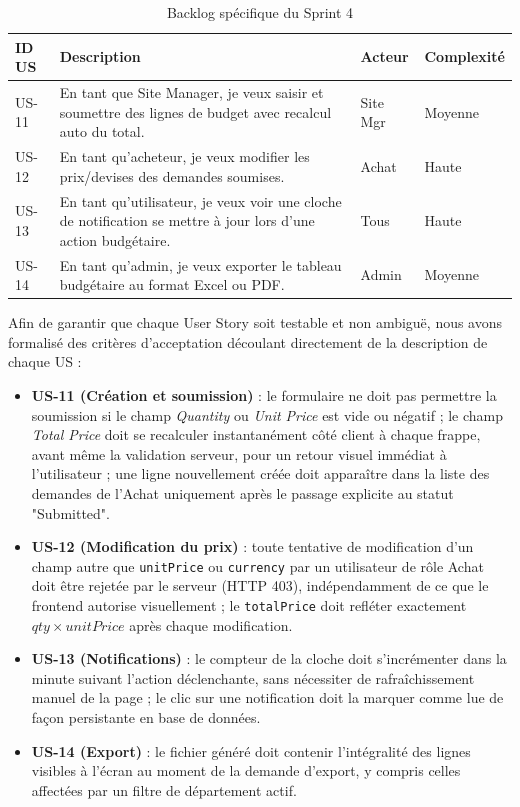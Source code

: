 \begin{table}[h]
\centering
\begin{tabular}{|p{2cm}|p{8cm}|p{2cm}|p{2cm}|}
\hline
\textbf{ID US} & \textbf{Description} & \textbf{Acteur} & \textbf{Complexité} \\ \hline
US-11 & En tant que Site Manager, je veux saisir et soumettre des lignes de budget avec recalcul auto du total. & Site Mgr & Moyenne \\ \hline
US-12 & En tant qu'acheteur, je veux modifier les prix/devises des demandes soumises. & Achat & Haute \\ \hline
US-13 & En tant qu'utilisateur, je veux voir une cloche de notification se mettre à jour lors d'une action budgétaire. & Tous & Haute \\ \hline
US-14 & En tant qu'admin, je veux exporter le tableau budgétaire au format Excel ou PDF. & Admin & Moyenne \\ \hline
\end{tabular}
\caption{Backlog spécifique du Sprint 4}
\label{tab:backlog_sprint4}
\end{table}

Afin de garantir que chaque User Story soit testable et non ambiguë, nous avons formalisé des critères d'acceptation découlant directement de la description de chaque US :

\begin{itemize}
    \item \textbf{US-11 (Création et soumission)} : le formulaire ne doit pas permettre la soumission si le champ \textit{Quantity} ou \textit{Unit Price} est vide ou négatif ; le champ \textit{Total Price} doit se recalculer instantanément côté client à chaque frappe, avant même la validation serveur, pour un retour visuel immédiat à l'utilisateur ; une ligne nouvellement créée doit apparaître dans la liste des demandes de l'Achat uniquement après le passage explicite au statut "Submitted".
    \item \textbf{US-12 (Modification du prix)} : toute tentative de modification d'un champ autre que \texttt{unitPrice} ou \texttt{currency} par un utilisateur de rôle Achat doit être rejetée par le serveur (HTTP 403), indépendamment de ce que le frontend autorise visuellement ; le \texttt{totalPrice} doit refléter exactement $qty \times unitPrice$ après chaque modification.
    \item \textbf{US-13 (Notifications)} : le compteur de la cloche doit s'incrémenter dans la minute suivant l'action déclenchante, sans nécessiter de rafraîchissement manuel de la page ; le clic sur une notification doit la marquer comme lue de façon persistante en base de données.
    \item \textbf{US-14 (Export)} : le fichier généré doit contenir l'intégralité des lignes visibles à l'écran au moment de la demande d'export, y compris celles affectées par un filtre de département actif.
\end{itemize}

